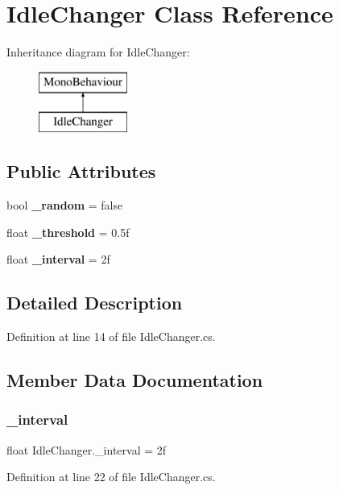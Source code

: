 \section{Idle\+Changer Class Reference}
\label{class_idle_changer}
Inheritance diagram for Idle\+Changer\+:\begin{figure}[H]
\begin{center}
\leavevmode
\includegraphics[height=2.000000cm]{class_idle_changer}
\end{center}
\end{figure}
\subsection*{Public Attributes}
\begin{DoxyCompactItemize}
\item 
bool \textbf{ \+\_\+random} = false
\item 
float \textbf{ \+\_\+threshold} = 0.\+5f
\item 
float \textbf{ \+\_\+interval} = 2f
\end{DoxyCompactItemize}


\subsection{Detailed Description}


Definition at line 14 of file Idle\+Changer.\+cs.



\subsection{Member Data Documentation}
\mbox{\label{class_idle_changer_ad5fe0b8dd4d79b5277fd62bda6516db2}} 
\subsubsection{\+\_\+interval}
{\footnotesize\ttfamily float Idle\+Changer.\+\_\+interval = 2f}



Definition at line 22 of file Idle\+Changer.\+cs.

